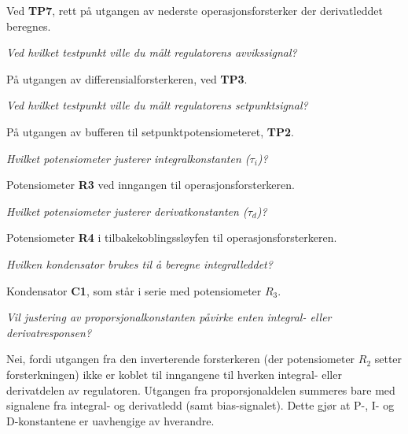 Ved {\bf TP7}, rett på utgangen av nederste operasjonsforsterker der derivatleddet beregnes.
 
\vskip 10pt

{\it Ved hvilket testpunkt ville du målt regulatorens avvikssignal?}

På utgangen av differensialforsterkeren, ved {\bf TP3}.
 
\vskip 10pt

{\it Ved hvilket testpunkt ville du målt regulatorens setpunktsignal?}

På utgangen av bufferen til setpunktpotensiometeret, {\bf TP2}.
 
\vskip 10pt

{\it Hvilket potensiometer justerer integralkonstanten ($\tau_i$)?}

Potensiometer {\bf R3} ved inngangen til operasjonsforsterkeren.
 
\vskip 10pt

{\it Hvilket potensiometer justerer derivatkonstanten ($\tau_d$)?}

Potensiometer {\bf R4} i tilbakekoblingssløyfen til operasjonsforsterkeren.
 
\vskip 10pt

{\it Hvilken kondensator brukes til å beregne integralleddet?}

Kondensator {\bf C1}, som står i serie med potensiometer $R_3$.
 
\vskip 10pt

{\it Vil justering av proporsjonalkonstanten påvirke enten integral- eller derivatresponsen?}

Nei, fordi utgangen fra den inverterende forsterkeren (der potensiometer $R_2$ setter forsterkningen) ikke er koblet til inngangene til hverken integral- eller derivatdelen av regulatoren. Utgangen fra proporsjonaldelen summeres bare med signalene fra integral- og derivatledd (samt bias-signalet). Dette gjør at P-, I- og D-konstantene er uavhengige av hverandre.
 

